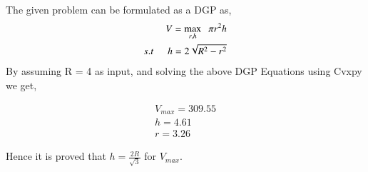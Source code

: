 \documentclass[journal,12pt,twocolumn]{IEEEtran}
\begin{document}
The given problem can be formulated as a DGP as,
\begin{align}
V = \max\limits_{r,h} \hspace{0.2cm} \pi r^2 h\\
s.t \hspace{0.5cm} h = 2\sqrt{R^2 - r^2}
\label{eq8}
\end{align}
By assuming R = 4 as input, and solving the above DGP Equations using Cvxpy we get,

\begin{align}
V_{max} = 309.55\\
h = 4.61\\
r = 3.26
\end{align} 

Hence it is proved that $ h = \frac{2R}{\sqrt{3}}$ for $V_{max}$.\\
\vspace{0.5cm}
\end{document}
